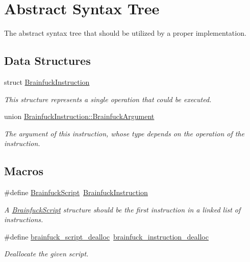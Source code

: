 \hypertarget{group__ast}{}\section{Abstract Syntax Tree}
\label{group__ast}


The abstract syntax tree that should be utilized by a proper implementation.  


\subsection*{Data Structures}
\begin{DoxyCompactItemize}
\item 
struct \hyperlink{structBrainfuckInstruction}{Brainfuck\+Instruction}
\begin{DoxyCompactList}\small\item\em This structure represents a single operation that could be executed. \end{DoxyCompactList}\item 
union \hyperlink{unionBrainfuckInstruction_1_1BrainfuckArgument}{Brainfuck\+Instruction\+::\+Brainfuck\+Argument}
\begin{DoxyCompactList}\small\item\em The argument of this instruction, whose type depends on the operation of the instruction. \end{DoxyCompactList}\end{DoxyCompactItemize}
\subsection*{Macros}
\begin{DoxyCompactItemize}
\item 
\#define \hyperlink{group__ast_ga9084bd8dcac602fdcbf7ca845b1e1b20}{Brainfuck\+Script}~\hyperlink{structBrainfuckInstruction}{Brainfuck\+Instruction}
\begin{DoxyCompactList}\small\item\em A \hyperlink{group__ast_ga9084bd8dcac602fdcbf7ca845b1e1b20}{Brainfuck\+Script} structure should be the first instruction in a linked list of instructions. \end{DoxyCompactList}\item 
\#define \hyperlink{group__ast_ga17fff4afb8ab8bd26f41724878a9997b}{brainfuck\+\_\+script\+\_\+dealloc}~\hyperlink{group__ast_ga2028b09c7f2692fb7fe2cee732919b2d}{brainfuck\+\_\+instruction\+\_\+dealloc}
\begin{DoxyCompactList}\small\item\em Deallocate the given script. \end{DoxyCompactList}\end{DoxyCompactItemize}
